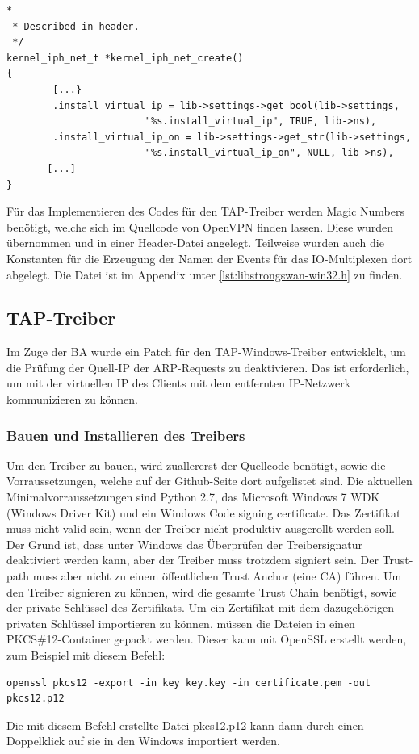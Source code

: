 \begin{lstlisting}[caption=Ergänzung zu kernel\_iph\_net\_create()]
*
 * Described in header.
 */
kernel_iph_net_t *kernel_iph_net_create()
{
        [...}
		.install_virtual_ip = lib->settings->get_bool(lib->settings,
						"%s.install_virtual_ip", TRUE, lib->ns),
		.install_virtual_ip_on = lib->settings->get_str(lib->settings,
						"%s.install_virtual_ip_on", NULL, lib->ns),
	   [...]
}
\end{lstlisting}

Für das Implementieren des Codes für den TAP-Treiber werden Magic Numbers benötigt,
welche sich im Quellcode von OpenVPN finden lassen. Diese wurden übernommen
und in einer Header-Datei angelegt.
Teilweise wurden auch die Konstanten für die Erzeugung der Namen der Events für
das IO-Multiplexen dort abgelegt. Die Datei ist im Appendix unter \autoref{lst:libstrongswan-win32.h}
zu finden.

\subsection{TAP-Treiber}
Im Zuge der \ac{BA} wurde ein Patch für den TAP-Windows-Treiber entwicklelt, um die
Prüfung der Quell-IP der ARP-Requests zu deaktivieren. Das ist erforderlich, um mit der
virtuellen IP des Clients mit dem entfernten IP-Netzwerk kommunizieren zu können.


\subsubsection{Bauen und Installieren des Treibers}
Um den Treiber zu bauen, wird zuallererst der Quellcode benötigt, sowie die
Vorraussetzungen, welche auf der Github-Seite dort aufgelistet sind.
Die aktuellen Minimalvorraussetzungen sind Python 2.7, das Microsoft Windows 7 WDK (Windows Driver Kit)
und ein Windows Code signing certificate.
Das Zertifikat muss nicht valid sein, wenn der Treiber nicht produktiv ausgerollt
werden soll. Der Grund ist, dass unter Windows das Überprüfen der Treibersignatur deaktiviert
werden kann, aber der Treiber muss trotzdem signiert sein. Der Trust-path muss aber nicht
zu einem öffentlichen Trust Anchor (eine CA) führen. Um den Treiber signieren zu können,
wird die gesamte Trust Chain benötigt, sowie der private Schlüssel des Zertifikats.
Um ein Zertifikat mit dem dazugehörigen privaten Schlüssel importieren zu können,
müssen die Dateien in einen PKCS\#12-Container gepackt werden. Dieser kann mit 
OpenSSL erstellt werden, zum Beispiel mit diesem Befehl:
\begin{lstlisting}[caption=OpenSSL PKCS\#12]
openssl pkcs12 -export -in key key.key -in certificate.pem -out pkcs12.p12
\end{lstlisting}
Die mit diesem Befehl erstellte Datei pkcs12.p12 kann dann durch einen Doppelklick auf sie
in den Windows importiert werden.

